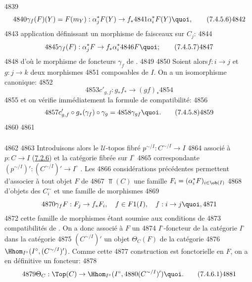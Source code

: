   4839	\begin{equation*}
  4840	\gamma_f (F) (Y) = F(m_Y) : \alpha_{j}^{\ast} F(Y) \to f_{\ast}
  4841	\alpha^{\ast}_i F(Y){\quoi},\tag{7.4.5.6}
  4842	\end{equation*}
  4843	application définissant un morphisme de faisceaux sur $C_j$:
  4844	\begin{equation*}
  4845	\gamma_f (F) : \alpha_{j}^{\ast} F \to f_{\ast} \alpha^{\ast}_i
  4846	F{\quoi};\tag{7.4.5.7}
  4847	\end{equation*}
  4848	d'où le morphisme de foncteurs $\gamma_f$ de .
  4849	
  4850	Soient alors\pageoriginale $f : i \to j$ et $g : j \to k$ deux morphismes
  4851	composables de $I$. On a un isomorphisme canonique:
  4852	$$
  4853	c'_{g, f} : g_{\ast} f_{\ast} \to (gf)_{\ast}
  4854	$$
  4855	et on vérifie immédiatement la formule de compatibilité:
  4856	\begin{equation*}
  4857	c'_{g, f} \circ g_{\ast} (\gamma_f) \circ \gamma_g =
  4858	\gamma_{gf}{\quoi}.\tag{7.4.5.8}
  4859	\end{equation*}
  4860	
  4861	\subsubsection{}
  4862	
  4863	Introduisons alors le $𝒰$-topos fibré $p^{\sim/I} : C^{\sim/I} \to I$
  4864	associé à $p : C \to I$ (\hyperref[VI.subsubsec7.2.6]{7.2.6}) et la catégorie fibrée sur $I^{\circ}$
  4865	correspondante $(p^{\sim/I})' :(C^{\sim/I})'\to I^{\circ}$ . Les
  4866	considérations précédentes permettent d'associer à tout objet $F$ de
  4867	$\Top(C)$ une famille $F_i = (\alpha^{\ast}_i F)_{i \in \ob (I)}$
  4868	d'objets des $C^{\sim}_i$ et une famille de morphismes
  4869	$$
  4870	\gamma_f F : F_j \to f_{\ast} F_i,\quad f\in F1(I),\quad f : i \to j{\quoi},
  4871	$$
  4872	cette famille de morphismes étant soumise aux conditions de
  4873	compatibilités de . On a donc associé à $F$ un
  4874	$I^{\circ}$-foncteur de la catégorie $I^{\circ}$ dans la catégorie
  4875	$(C^{\sim/I})'$ \ie un objet $\Theta_C (F)$ de la catégorie
  4876	$\Hhom_{I^{\circ}} (I^{\circ}, (C^{\sim/I})')$. Comme cette
  4877	construction est fonctorielle en $F$, on a en définitive un foncteur:
  4878	\begin{equation*}
  4879	\Theta_C : \Top(C) \to \Hhom_{I^{\circ}} (I^{\circ},
  4880	(C^{\sim/I})'){\quoi}.\tag{7.4.6.1}
  4881	\end{equation*}
